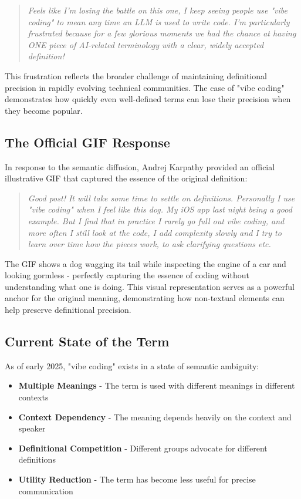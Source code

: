 \documentclass[11pt]{article}
\begin{document}
\begin{quote}
\emph{Feels like I'm losing the battle on this one, I keep seeing people use "vibe coding" to mean any time an LLM is used to write code. I'm particularly frustrated because for a few glorious moments we had the chance at having ONE piece of AI-related terminology with a clear, widely accepted definition!}
\end{quote}

This frustration reflects the broader challenge of maintaining definitional precision in rapidly evolving technical communities. The case of "vibe coding" demonstrates how quickly even well-defined terms can lose their precision when they become popular.

\subsection{The Official GIF Response}

In response to the semantic diffusion, Andrej Karpathy provided an official illustrative GIF that captured the essence of the original definition:

\begin{quote}
\emph{Good post! It will take some time to settle on definitions. Personally I use "vibe coding" when I feel like this dog. My iOS app last night being a good example. But I find that in practice I rarely go full out vibe coding, and more often I still look at the code, I add complexity slowly and I try to learn over time how the pieces work, to ask clarifying questions etc.}
\end{quote}

The GIF shows a dog wagging its tail while inspecting the engine of a car and looking gormless - perfectly capturing the essence of coding without understanding what one is doing. This visual representation serves as a powerful anchor for the original meaning, demonstrating how non-textual elements can help preserve definitional precision.

\subsection{Current State of the Term}

As of early 2025, "vibe coding" exists in a state of semantic ambiguity:

\begin{itemize}
\item \textbf{Multiple Meanings} - The term is used with different meanings in different contexts
\item \textbf{Context Dependency} - The meaning depends heavily on the context and speaker
\item \textbf{Definitional Competition} - Different groups advocate for different definitions
\item \textbf{Utility Reduction} - The term has become less useful for precise communication
\end{itemize}
\end{document}
